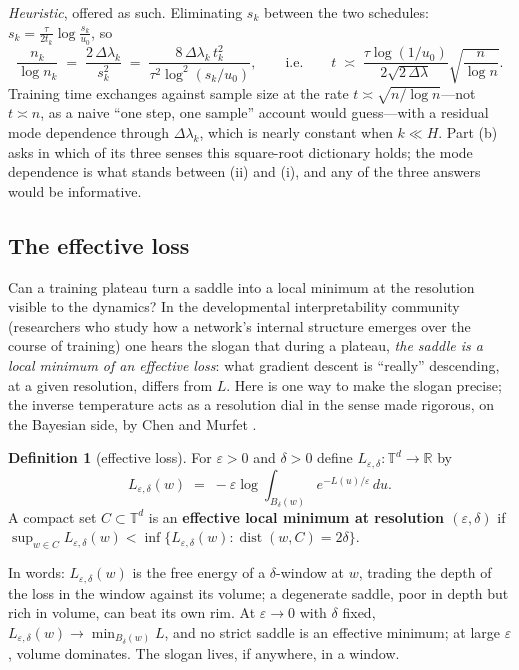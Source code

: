 \documentclass[11pt]{amsart}
\theoremstyle{plain}
\theoremstyle{definition}
\newtheorem{definition}[theorem]{Definition}
\newcommand{\R}{\mathbb{R}}
\newcommand{\T}{\mathbb{T}}
\newcommand{\dist}{\operatorname{dist}}
\begin{document}
\emph{Heuristic}, offered as such. Eliminating $s_k$ between the two schedules: $s_k = \tfrac{\tau}{2 t_k} \log \tfrac{s_k}{u_0}$, so
\[
   \frac{n_k}{\log n_k} \;=\; \frac{2 \, \Delta\lambda_k}{s_k^2}
   \;=\; \frac{8 \, \Delta\lambda_k \, t_k^2}{\tau^2 \log^2 (s_k/u_0)} ,
   \qquad \text{i.e.} \qquad
   t \;\asymp\; \frac{\tau \log(1/u_0)}{2\sqrt{2\, \Delta\lambda}} \sqrt{ \frac{n}{\log n} } .
\]
Training time exchanges against sample size at the rate $t \asymp \sqrt{n / \log n}$---not $t \asymp n$, as a naive ``one step, one sample'' account would guess---with a residual mode dependence through $\Delta\lambda_k$, which is nearly constant when $k \ll H$. Part (b) asks in which of its three senses this square-root dictionary holds; the mode dependence is what stands between (ii) and (i), and any of the three answers would be informative.

\subsection{The effective loss}\label{sec:effective-loss}

Can a training plateau turn a saddle into a local minimum at the resolution visible to the dynamics? In the developmental interpretability community (researchers who study how a network's internal structure emerges over the course of training) one hears the slogan that during a plateau, \emph{the saddle is a local minimum of an effective loss}: what gradient descent is ``really'' descending, at a given resolution, differs from $L$. Here is one way to make the slogan precise; the inverse temperature acts as a resolution dial in the sense made rigorous, on the Bayesian side, by Chen and Murfet \cite{chenmurfet2025}.

\begin{definition}[effective loss]\label{def:effective-loss}
For $\varepsilon > 0$ and $\delta > 0$ define $L_{\varepsilon, \delta}\colon \T^d \to \R$ by
\[
   L_{\varepsilon, \delta}(w) \;=\; -\varepsilon \log \int_{B_\delta(w)} e^{-L(u)/\varepsilon} \, du .
\]
A compact set $C \subset \T^d$ is an \textbf{effective local minimum at resolution $(\varepsilon, \delta)$} if
$\sup_{w \in C} L_{\varepsilon,\delta}(w) < \inf \{ L_{\varepsilon,\delta}(w) : \dist(w, C) = 2\delta \}$.
\end{definition}

In words: $L_{\varepsilon,\delta}(w)$ is the free energy of a $\delta$-window at $w$, trading the depth of the loss in the window against its volume; a degenerate saddle, poor in depth but rich in volume, can beat its own rim. At $\varepsilon \to 0$ with $\delta$ fixed, $L_{\varepsilon,\delta}(w) \to \min_{B_\delta(w)} L$, and no strict saddle is an effective minimum; at large $\varepsilon$, volume dominates. The slogan lives, if anywhere, in a window.
\end{document}

